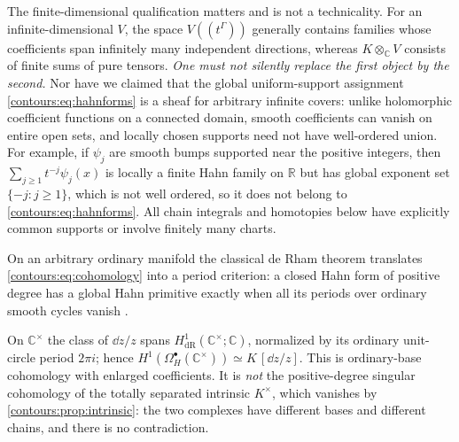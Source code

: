 \documentclass[11pt,letterpaper]{article}
\theoremstyle{definition}
\theoremstyle{remark}
\newcommand{\R}{\mathbb R}\newcommand{\C}{\mathbb C}\newcommand{\Q}{\mathbb Q}
\newcommand{\dR}{\mathrm{dR}}
\numberwithin{equation}{section}
\begin{document}
The finite-dimensional qualification matters and is not a technicality. For an
infinite-dimensional $V$, the space $V((t^\Gamma))$ generally contains families
whose coefficients span infinitely many independent directions, whereas
$K\otimes_\C V$ consists of finite sums of pure tensors. \emph{One must not
silently replace the first object by the second.} Nor have we claimed that the
global uniform-support assignment \eqref{contours:eq:hahnforms} is a sheaf for
arbitrary infinite covers: unlike holomorphic coefficient functions on a connected
domain, smooth coefficients can vanish on entire open sets, and locally chosen
supports need not have well-ordered union. For example, if $\psi_j$ are smooth
bumps supported near the positive integers, then $\sum_{j\ge1}t^{-j}\psi_j(x)$ is
locally a finite Hahn family on $\R$ but has global exponent set $\{-j:j\ge1\}$,
which is not well ordered, so it does not belong to
\eqref{contours:eq:hahnforms}. All chain integrals and homotopies below have
explicitly common supports or involve finitely many charts.

On an arbitrary ordinary manifold the classical de Rham theorem translates
\eqref{contours:eq:cohomology} into a period criterion: a closed Hahn form of
positive degree has a global Hahn primitive exactly when all its periods over
ordinary smooth cycles vanish \cite{Lee}.

\begin{example}\label{contours:ex:puncture}
On $\C^\times$ the class of $\dd z/z$ spans $H^1_\dR(\C^\times;\C)$, normalized by
its ordinary unit-circle period $2\pi i$; hence
$H^1(\Omega_H^\bullet(\C^\times))\simeq K\,[\dd z/z]$. This is ordinary-base
cohomology with enlarged coefficients. It is \emph{not} the positive-degree
singular cohomology of the totally separated intrinsic $K^\times$, which vanishes
by \cref{contours:prop:intrinsic}: the two complexes have different bases and
different chains, and there is no contradiction.
\end{example}
\end{document}
